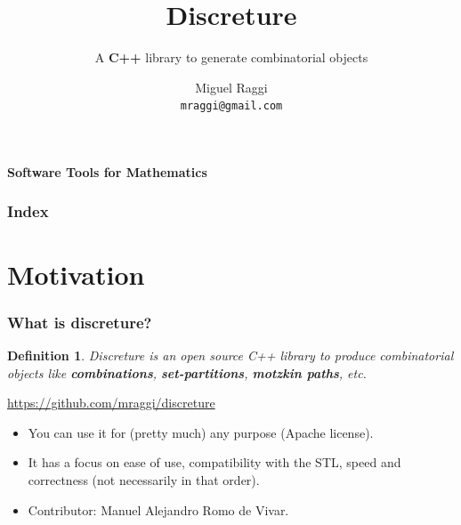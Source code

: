 \documentclass[spanish,professionalfonts]{beamer}
\title{Discreture}
\author{Miguel Raggi \\ \texttt{mraggi@gmail.com}}
\institute{Escuela Nacional de Estudios Superiores \\ UNAM}
\subtitle{A \textbf{C++} library to generate \tcg{simple} combinatorial objects}
\def\tcr#1{\textcolor{MyRed}{#1}}
\def\tcg#1{\textcolor{MyGreen}{#1}}
\def\tcp#1{\textcolor{MyPurple}{#1}}
\newtheorem{definicion}{Definition}
\begin{document}

\begin{frame}
\begin{center}
\large{\tcg{\textbf{Software Tools for Mathematics}}}
\end{center}
\titlepage
\end{frame}

\begin{frame}
\frametitle{Index}
\tableofcontents
\end{frame} 

\section{Motivation}

\begin{frame}\frametitle{What is discreture?}
  \begin{definicion}
    \tcp{Discreture} is an open source C++ library to produce combinatorial objects like \textbf{combinations}, \textbf{set-partitions}, \textbf{motzkin paths}, etc.
  \end{definicion}

  \begin{center}
   \url{https://github.com/mraggi/discreture}
  \end{center}  \pause

  \begin{itemize}
    \item You can use it for (pretty much) any purpose (Apache license). \pause
    \item It has a focus on \tcg{ease of use}, \tcp{compatibility with the STL}, \tcg{speed} and \tcg{correctness} \pause (not necessarily in that order).\pause
    \item \tcr{Contributor:} Manuel Alejandro Romo de Vivar.
  \end{itemize}

\end{frame}

\end{document}
